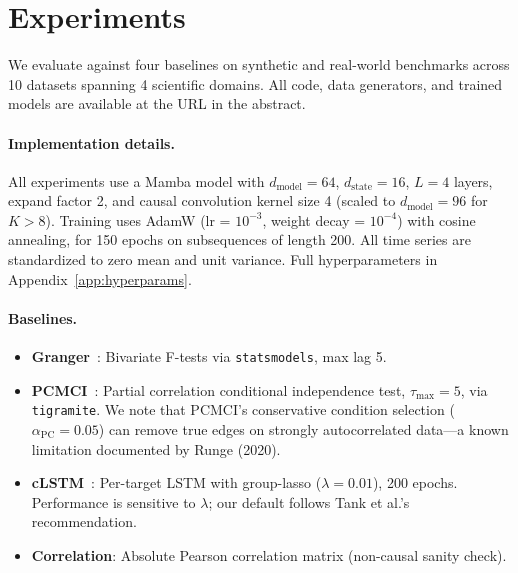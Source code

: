 
\section{Experiments}
\label{sec:experiments}

We evaluate \methodname{} against four baselines on synthetic and
real-world benchmarks across 10 datasets spanning 4 scientific domains.
All code, data generators, and trained models are available at the URL
in the abstract.

\paragraph{Implementation details.}
All experiments use a Mamba model with $d_{\text{model}} = 64$,
$d_{\text{state}} = 16$, $L = 4$ layers, expand factor 2, and causal
convolution kernel size 4 (scaled to $d_{\text{model}} = 96$ for
$K > 8$). Training uses AdamW (lr = $10^{-3}$, weight decay =
$10^{-4}$) with cosine annealing, for 150 epochs on subsequences of
length 200. All time series are standardized to zero mean and unit
variance. Full hyperparameters in Appendix~\ref{app:hyperparams}.

\paragraph{Baselines.}
\begin{itemize}[leftmargin=1.5em, topsep=0pt, itemsep=0pt]
    \item \textbf{Granger}~\citep{granger1969investigating}: Bivariate
    F-tests via \texttt{statsmodels}, max lag 5.
    \item \textbf{PCMCI}~\citep{runge2019pcmci}: Partial correlation
    conditional independence test, $\tau_{\max} = 5$, via
    \texttt{tigramite}. We note that PCMCI's conservative condition
    selection ($\alpha_{\text{PC}} = 0.05$) can remove true edges on
    strongly autocorrelated data---a known limitation documented by
    Runge (2020).
    \item \textbf{cLSTM}~\citep{tank2021neural}: Per-target LSTM with
    group-lasso ($\lambda = 0.01$), 200 epochs. Performance is
    sensitive to $\lambda$; our default follows Tank et al.'s
    recommendation.
    \item \textbf{Correlation}: Absolute Pearson correlation matrix
    (non-causal sanity check).
\end{itemize}

